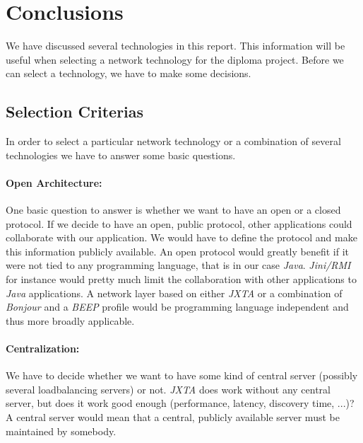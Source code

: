 \section{Conclusions}
We have discussed several technologies in this report. This information will be useful when selecting a network technology for the diploma project. Before we can select a technology, we have to make some decisions.


\subsection{Selection Criterias}
In order to select a particular network technology or a combination of several technologies we have to answer some basic questions.

\paragraph{Open Architecture:} One basic question to answer is whether we want to have an open or a closed protocol. If we decide to have an open, public protocol, other applications could collaborate with our application. We would have to define the protocol and make this information publicly available. An open protocol would greatly benefit if it were not tied to any programming language, that is in our case \emph{Java}. \emph{Jini/RMI} for instance would pretty much limit the collaboration with other applications to \emph{Java} applications. A network layer based on either \emph{JXTA} or a combination of \emph{Bonjour} and a \emph{BEEP} profile would be programming language independent and thus more broadly applicable.

\paragraph{Centralization:} We have to decide whether we want to have some kind of central server (possibly several loadbalancing servers) or not. \emph{JXTA} does work without any central server, but does it work good enough (performance, latency, discovery time, ...)? A central server would mean that a central, publicly available server must be maintained by somebody. 